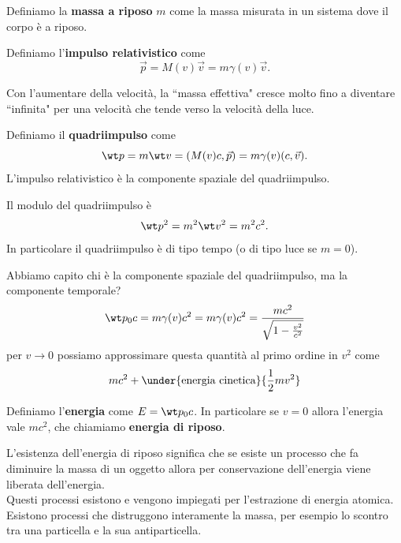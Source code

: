 \begin{definition}
Definiamo la \textbf{massa a riposo} $m$ come la massa misurata in un sistema dove il corpo \`e a riposo.
\end{definition}

\begin{definition}
Definiamo l'\textbf{impulso relativistico} come
\[\vec p=M(v)\vec v=m\gamma(v)\vec v.\]
\end{definition}
\begin{remark}
Con l'aumentare della velocit\`a, la ``massa effettiva" cresce molto fino a diventare ``infinita" per una velocit\`a che tende verso la velocit\`a della luce.
\end{remark}

\begin{definition}[Quadriimpulso]
Definiamo il \textbf{quadriimpulso} come
\[\wt p=m\wt v=(M(v)c,\vec p)=m\gamma(v)(c,\vec v).\]
L'impulso relativistico \`e la componente spaziale del quadriimpulso.
\end{definition}

\begin{remark}
Il modulo del quadriimpulso \`e
\[\wt p^2=m^2\wt v^2=m^2c^2.\]
In particolare il quadriimpulso \`e di tipo tempo (o di tipo luce se $m=0$).
\end{remark}

\noindent Abbiamo capito chi \`e la componente spaziale del quadriimpulso, ma la componente temporale?
\[\wt p_0c=m\gamma(v)c^2=m\gamma(v)c^2=\frac{mc^2}{\sqrt{1-\frac{v^2}{c^2}}}\]
per $v\to 0$ possiamo approssimare questa quantit\`a al primo ordine in $v^2$ come
\[mc^2+\under{\text{energia cinetica}}{\frac12 mv^2}\]

\begin{definition}[Energia]
Definiamo l'\textbf{energia} come $E=\wt p_0c$. In particolare se $v=0$ allora l'energia vale $mc^2$, che chiamiamo \textbf{energia di riposo}.
\end{definition}

\begin{remark}
L'esistenza dell'energia di riposo significa che se esiste un processo che fa diminuire la massa di un oggetto allora per conservazione dell'energia viene liberata dell'energia.\\
Questi processi esistono e vengono impiegati per l'estrazione di energia atomica.\\
Esistono processi che distruggono interamente la massa, per esempio lo scontro tra una particella e la sua antiparticella.
\end{remark}


